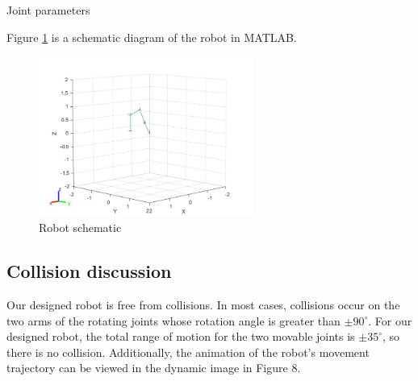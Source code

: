 \begin{minipage}[htbp]{\textwidth}
    \makeatletter{}
    \centering
    \caption{Joint parameters}
    \label{T 2.2} 
\end{minipage}

Figure \ref{F 2.1} is a schematic diagram of the robot in MATLAB.
\begin{figure}[htbp]
    \centering
    \includegraphics[width=7cm]{./fig/1.jpg}
    \caption{Robot schematic}
    \label{F 2.1}
\end{figure}

\subsection{Collision discussion}

Our designed robot is free from collisions. In most cases, collisions occur on the two arms of the rotating joints whose rotation angle is greater than $±90^\circ$. For our designed robot, the total range of motion for the two movable joints is $±35^\circ$, so there is no collision. Additionally, the animation of the robot's movement trajectory can be viewed in the dynamic image in Figure 8.
